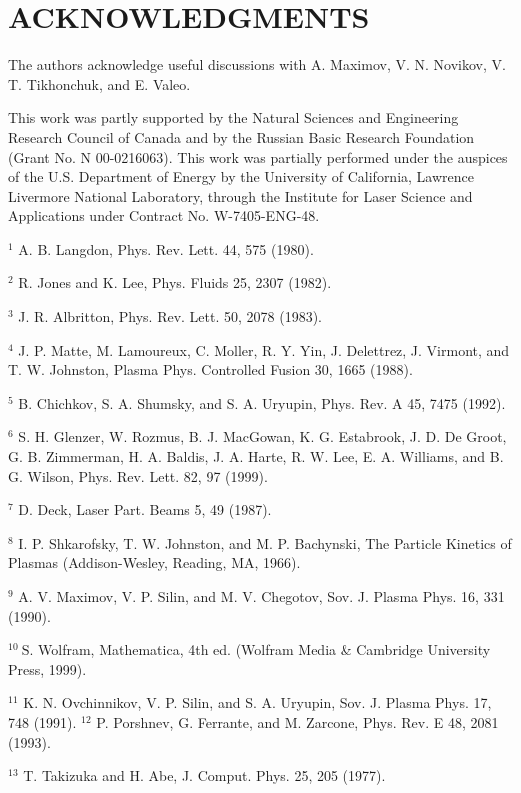 \documentclass[oneside,onecolumn]{article}
\begin{document}
\begin{sloppypar}
{}
  
 \section{ACKNOWLEDGMENTS}
The authors acknowledge useful discussions with A. Maximov, V. N. Novikov, V. T. Tikhonchuk, and E. Valeo.

This work was partly supported by the Natural Sciences and Engineering Research Council of Canada and by the Russian Basic Research Foundation (Grant No. N 00-0216063). This work was partially performed under the auspices of the U.S. Department of Energy by the University of California, Lawrence Livermore National Laboratory, through the Institute for Laser Science and Applications under Contract No. W-7405-ENG-48.

${ }^{1}$ A. B. Langdon, Phys. Rev. Lett. 44, 575 (1980).

${ }^{2}$ R. Jones and K. Lee, Phys. Fluids 25, 2307 (1982).

${ }^{3}$ J. R. Albritton, Phys. Rev. Lett. 50, 2078 (1983).

${ }^{4}$ J. P. Matte, M. Lamoureux, C. Moller, R. Y. Yin, J. Delettrez, J. Virmont, and T. W. Johnston, Plasma Phys. Controlled Fusion 30, 1665 (1988).

${ }^{5}$ B. Chichkov, S. A. Shumsky, and S. A. Uryupin, Phys. Rev. A 45, 7475 (1992).

${ }^{6}$ S. H. Glenzer, W. Rozmus, B. J. MacGowan, K. G. Estabrook, J. D. De Groot, G. B. Zimmerman, H. A. Baldis, J. A. Harte, R. W. Lee, E. A. Williams, and B. G. Wilson, Phys. Rev. Lett. 82, 97 (1999).

${ }^{7}$ D. Deck, Laser Part. Beams 5, 49 (1987).

${ }^{8}$ I. P. Shkarofsky, T. W. Johnston, and M. P. Bachynski, The Particle Kinetics of Plasmas (Addison-Wesley, Reading, MA, 1966).

${ }^{9}$ A. V. Maximov, V. P. Silin, and M. V. Chegotov, Sov. J. Plasma Phys. 16, 331 (1990).

${ }^{10} \mathrm{~S}$. Wolfram, Mathematica, 4th ed. (Wolfram Media \& Cambridge University Press, 1999).

${ }^{11}$ K. N. Ovchinnikov, V. P. Silin, and S. A. Uryupin, Sov. J. Plasma Phys. 17, 748 (1991). ${ }^{12}$ P. Porshnev, G. Ferrante, and M. Zarcone, Phys. Rev. E 48, 2081 (1993).

${ }^{13}$ T. Takizuka and H. Abe, J. Comput. Phys. 25, 205 (1977).


\end{sloppypar}
\end{document}
